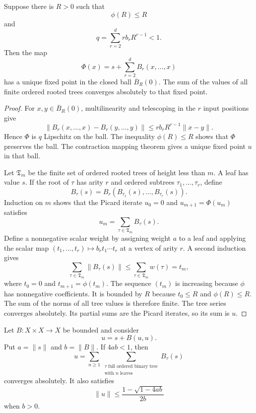 \begin{theorem}\label{thm:polynomial_tree_expansion}
Suppose there is $R>0$ such that
\[
\phi(R)\le R
\]
and
\[
q=
\sum_{r=2}^{d}r b_rR^{r-1}<1.
\]
Then the map
\[
\Phi(x)=s+\sum_{r=2}^{d}B_r(x,\ldots,x)
\]
has a unique fixed point in the closed ball $\overline B_R(0)$.  The sum of the values of all finite ordered rooted trees converges absolutely to that fixed point.
\end{theorem}

\begin{proof}
For $x,y\in\overline B_R(0)$, multilinearity and telescoping in the $r$ input positions give
\[
\|B_r(x,\ldots,x)-B_r(y,\ldots,y)\|
\le
r b_rR^{r-1}\|x-y\|.
\]
Hence $\Phi$ is $q$ Lipschitz on the ball.  The inequality $\phi(R)\le R$ shows that $\Phi$ preserves the ball.  The contraction mapping theorem gives a unique fixed point $u$ in that ball.

Let $\mathfrak T_m$ be the finite set of ordered rooted trees of height less than $m$.  A leaf has value $s$.  If the root of $\tau$ has arity $r$ and ordered subtrees $\tau_1,\ldots,\tau_r$, define
\[
B_\tau(s)=B_r(B_{\tau_1}(s),\ldots,B_{\tau_r}(s)).
\]
Induction on $m$ shows that the Picard iterate $u_0=0$ and $u_{m+1}=\Phi(u_m)$ satisfies
\[
u_m=\sum_{\tau\in\mathfrak T_m}B_\tau(s).
\]
Define a nonnegative scalar weight by assigning weight $a$ to a leaf and applying the scalar map $(t_1,\ldots,t_r)\mapsto b_rt_1\cdots t_r$ at a vertex of arity $r$.  A second induction gives
\[
\sum_{\tau\in\mathfrak T_m}\|B_\tau(s)\|
\le
\sum_{\tau\in\mathfrak T_m}w(\tau)
=t_m,
\]
where $t_0=0$ and $t_{m+1}=\phi(t_m)$.  The sequence $(t_m)$ is increasing because $\phi$ has nonnegative coefficients.  It is bounded by $R$ because $t_0\le R$ and $\phi(R)\le R$.  The sum of the norms of all tree values is therefore finite.  The tree series converges absolutely.  Its partial sums are the Picard iterates, so its sum is $u$.
\end{proof}

\begin{corollary}\label{cor:quadratic_tree_expansion}
Let $B:X\times X\to X$ be bounded and consider
\[
u=s+B(u,u).
\]
Put $a=\|s\|$ and $b=\|B\|$.  If $4ab<1$, then
\[
u=
\sum_{n\ge1}
\sum_{\substack{\tau\text{ full ordered binary tree}\\\text{with }n\text{ leaves}}}
B_\tau(s)
\]
converges absolutely.  It also satisfies
\[
\|u\|
\le
\frac{1-\sqrt{1-4ab}}{2b}
\]
when $b>0$.
\end{corollary}

